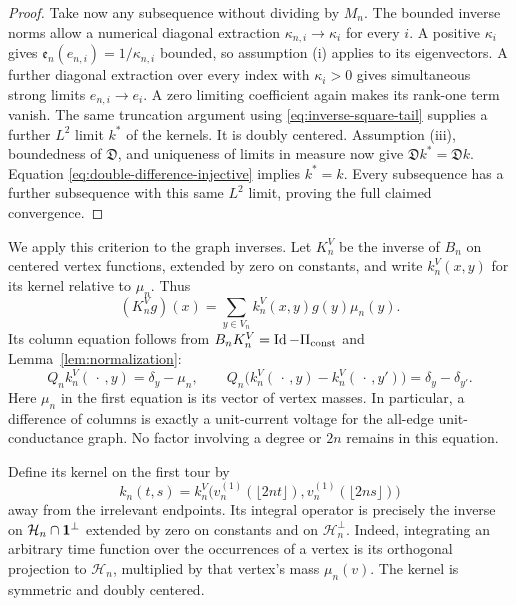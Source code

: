 \begin{proof}
Take now any subsequence without dividing by \(M_n\).  The bounded inverse
norms allow a numerical diagonal extraction
\(\kappa_{n,i}\to\kappa_i\) for every \(i\).  A positive \(\kappa_i\)
gives \(\mathfrak e_n(e_{n,i})=1/\kappa_{n,i}\) bounded, so assumption (i)
applies to its eigenvectors.  A further diagonal extraction over every
index with \(\kappa_i>0\) gives simultaneous strong limits
\(e_{n,i}\to e_i\).  A zero limiting coefficient again makes its rank-one
term vanish.  The same truncation
argument using \eqref{eq:inverse-square-tail} supplies a further
\(L^2\) limit \(k^*\) of the kernels.  It is doubly centered.  Assumption
(iii), boundedness of \(\mathfrak D\), and uniqueness of limits in measure
now give \(\mathfrak Dk^*=\mathfrak Dk\).  Equation
\eqref{eq:double-difference-injective} implies \(k^*=k\).  Every subsequence
has a further subsequence with this same \(L^2\) limit, proving the full
claimed convergence.
\end{proof}

We apply this criterion to the graph inverses.  Let \(K_n^V\) be the
inverse of \(B_n\) on centered vertex functions, extended by zero on
constants, and write \(k_n^V(x,y)\) for its kernel relative to \(\mu_n\).
Thus
\[
 (K_n^Vg)(x)=\sum_{y\in V_n} k_n^V(x,y)g(y)\mu_n(y).
\]
Its column equation follows from \(B_nK_n^V=\operatorname{Id}-\Pi_{\mathrm{const}}\)
and Lemma~\ref{lem:normalization}:
\[
 Q_n k_n^V(\,\cdot\,,y)=\delta_y-\mu_n,
 \qquad
 Q_n\bigl(k_n^V(\,\cdot\,,y)-k_n^V(\,\cdot\,,y')\bigr)
       =\delta_y-\delta_{y'}.
\]
Here \(\mu_n\) in the first equation is its vector of vertex masses.
In particular, a difference of columns is exactly a unit-current voltage
for the all-edge unit-conductance graph.  No factor involving a degree or
\(2n\) remains in this equation.

Define its kernel on the first tour by
\[
 k_n(t,s)=k_n^V\bigl(v_n^{(1)}(\lfloor2nt\rfloor),
                         v_n^{(1)}(\lfloor2ns\rfloor)\bigr)
\]
away from the irrelevant endpoints.  Its integral operator is precisely
the inverse on \(\mathcal H_n\cap\mathbf 1^\perp\) extended by zero on constants and on
\(\mathcal H_n^\perp\).  Indeed, integrating an arbitrary time function over the
occurrences of a vertex is its orthogonal projection to \(\mathcal H_n\), multiplied
by that vertex's mass \(\mu_n(v)\).  The kernel is symmetric and doubly
centered.

